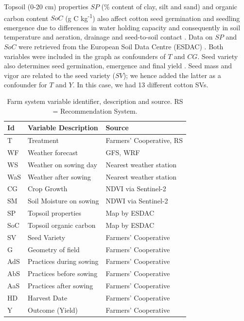 \documentclass[letterpaper]{article} %
\begin{document}
Topsoil (0-20 cm) properties $SP$ (\% content of clay, silt and sand) and organic carbon content  $SoC$ (g C kg\textsuperscript{-1}) also affect cotton seed germination and seedling emergence due to differences in water holding capacity and consequently in soil temperature and aeration, drainage and seed-to-soil contact \cite{varcosoil}. Data on $SP$ and $SoC$ were retrieved from the European Soil Data Centre (ESDAC) \cite{ballabio2016mapping, de2015map}. Both variables were included in the graph as confounders of $T$ and $CG$.
Seed variety also determines seed germination, emergence and final yield \cite{sniderseed}.
Seed mass and vigor \cite{liu2015early,sniderseed} are related to the seed variety ($SV$); we hence added the latter as a confounder for $T$ and $Y$. In this case, we had 13 different cotton SVs.

\begin{table}[!ht]
\small
\centering
\begin{tabular}{lll}
\toprule
\textbf{Id} & \textbf{Variable Description}           & \textbf{Source}         \\ \midrule
T   & Treatment & Farmers' Cooperative, RS
\\
WF  & Weather forecast             & GFS, WRF                \\
WS  & Weather on sowing day        & Nearest weather station \\
WaS & Weather after sowing         & Nearest weather station                  \\
CG  & Crop Growth                  & NDVI via Sentinel-2                      \\
SM  & Soil Moisture on sowing      & NDWI via Sentinel-2     \\
SP  & Topsoil properties           & Map by ESDAC \\
SoC & Topsoil organic carbon       & Map by ESDAC \\
SV  & Seed Variety                 & Farmers' Cooperative \\
G   & Geometry of field           & Farmers' Cooperative                  \\
AdS & Practices during sowing      & Farmers' Cooperative \\
AbS & Practices before sowing      & Farmers' Cooperative \\
AaS & Practices after sowing       & Farmers' Cooperative \\
HD  & Harvest Date                 & Farmers' Cooperative \\
Y   & Outcome (Yield)              & Farmers' Cooperative \\ \bottomrule
\end{tabular}%
\caption{Farm system variable identifier, description and source. RS = Recommendation System.}
\label{tab:variables}
\end{table}
\end{document}
